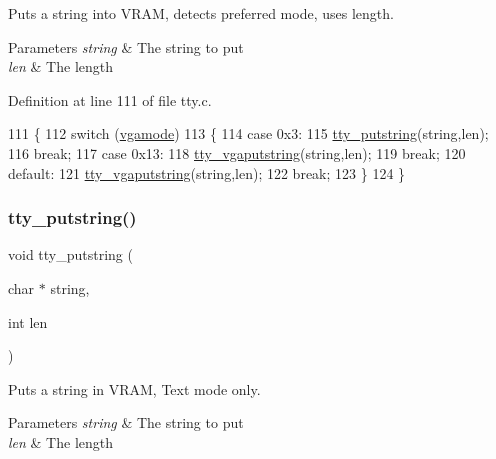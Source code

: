 Puts a string into V\+R\+AM, detects preferred mode, uses length. 


\begin{DoxyParams}{Parameters}
{\em string} & The string to put \\
\hline
{\em len} & The length \\
\hline
\end{DoxyParams}


Definition at line 111 of file tty.\+c.


\begin{DoxyCode}
111                                             \{
112     \textcolor{keywordflow}{switch} (\hyperlink{a00167_af93b0649fdd1bea5b6d29ed37205aa2c_af93b0649fdd1bea5b6d29ed37205aa2c}{vgamode})
113     \{
114     \textcolor{keywordflow}{case} 0x3:
115         \hyperlink{a00167_a5b5bf610a57f3c59b2851fa2652081ec_a5b5bf610a57f3c59b2851fa2652081ec}{tty\_putstring}(\textcolor{keywordtype}{string},len);
116         \textcolor{keywordflow}{break};
117     \textcolor{keywordflow}{case} 0x13:
118         \hyperlink{a00167_a05ca3f5e64f38fec173b635ca8465415_a05ca3f5e64f38fec173b635ca8465415}{tty\_vgaputstring}(\textcolor{keywordtype}{string},len);
119         \textcolor{keywordflow}{break};
120     \textcolor{keywordflow}{default}:
121         \hyperlink{a00167_a05ca3f5e64f38fec173b635ca8465415_a05ca3f5e64f38fec173b635ca8465415}{tty\_vgaputstring}(\textcolor{keywordtype}{string},len);
122         \textcolor{keywordflow}{break};
123     \}
124 \}
\end{DoxyCode}
\mbox{\label{a00167_a5b5bf610a57f3c59b2851fa2652081ec_a5b5bf610a57f3c59b2851fa2652081ec}} 
\subsubsection{\texorpdfstring{tty\+\_\+putstring()}{tty\_putstring()}}
{\footnotesize\ttfamily void tty\+\_\+putstring (\begin{DoxyParamCaption}\item[{char $\ast$}]{string,  }\item[{int}]{len }\end{DoxyParamCaption})}



Puts a string in V\+R\+AM, Text mode only. 


\begin{DoxyParams}{Parameters}
{\em string} & The string to put \\
\hline
{\em len} & The length \\
\hline
\end{DoxyParams}


